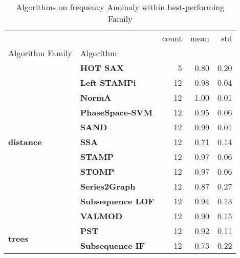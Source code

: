 \begin{table}
\caption{Algorithms on frequency Anomaly within best-performing Family}
\label{tab:bp-frequency}
\begin{tabular}{llrrr}
\toprule
 &  & count & mean & std \\
Algorithm Family & Algorithm &  &  &  \\
\midrule
\multirow[t]{11}{*}{\textbf{distance}} & \textbf{HOT SAX} & 5 & 0.80 & 0.20 \\
\textbf{} & \textbf{Left STAMPi} & 12 & 0.98 & 0.04 \\
\textbf{} & \textbf{NormA} & 12 & 1.00 & 0.01 \\
\textbf{} & \textbf{PhaseSpace-SVM} & 12 & 0.95 & 0.06 \\
\textbf{} & \textbf{SAND} & 12 & 0.99 & 0.01 \\
\textbf{} & \textbf{SSA} & 12 & 0.71 & 0.14 \\
\textbf{} & \textbf{STAMP} & 12 & 0.97 & 0.06 \\
\textbf{} & \textbf{STOMP} & 12 & 0.97 & 0.06 \\
\textbf{} & \textbf{Series2Graph} & 12 & 0.87 & 0.27 \\
\textbf{} & \textbf{Subsequence LOF} & 12 & 0.94 & 0.13 \\
\textbf{} & \textbf{VALMOD} & 12 & 0.90 & 0.15 \\
\cline{1-5}
\multirow[t]{2}{*}{\textbf{trees}} & \textbf{PST} & 12 & 0.92 & 0.11 \\
\textbf{} & \textbf{Subsequence IF} & 12 & 0.73 & 0.22 \\
\cline{1-5}
\bottomrule
\end{tabular}
\end{table}
